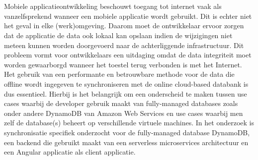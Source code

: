 



\chapter*{}

Mobiele applicatieontwikkeling beschouwt toegang tot internet vaak als vanzelfsprekend wanneer een mobiele applicatie wordt gebruikt. Dit is echter niet het geval in elke (werk)omgeving. Daarom moet de ontwikkelaar ervoor zorgen dat de applicatie de data ook lokaal kan opslaan indien de wijzigingen niet meteen kunnen worden doorgevoerd naar de achterliggende infrastructuur. Dit probleem vormt voor ontwikkelaars een uitdaging omdat de data integriteit moet worden gewaarborgd wanneer het toestel terug verbonden is met het Internet. Het gebruik van een performante en betrouwbare methode voor de data die offline wordt ingegeven te synchroniseren met de online cloud-based databank is dus essentieel. Hierbij is het belangrijk om een onderscheid te maken tussen use cases waarbij de developer gebruik maakt van fully-managed databases zoals onder andere DynamoDB van Amazon Web Services en use cases waarbij men zelf de database(s) beheert op verschillende virtuele machines. In het onderzoek is synchronisatie specifiek onderzocht voor de fully-managed database DynamoDB, een backend die gebruikt maakt van een serverless microservices architectuur en een Angular applicatie als client applicatie. 


